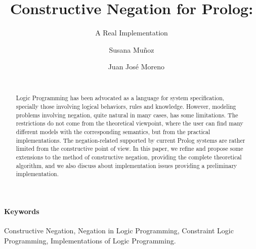 \documentclass{llncs}
\begin{document}

\title{Constructive Negation for Prolog:}
\subtitle{A Real Implementation}

\author{~~Susana Mu\~{n}oz~~ \and ~~ Juan Jos\'{e} Moreno \\
         ~~~~~~~~~~ }


\maketitle




\begin{abstract}
  Logic Programming has been advocated as a language for system
  specification, specially those involving logical behaviors, rules
  and knowledge. However, modeling problems involving negation, quite
  natural in many cases, has some limitations. The restrictions do not
  come from the theoretical viewpoint, where the user can find many
  different models with the corresponding semantics, but from the
  practical implementations.  The negation-related supported by
  current Prolog systems are rather limited from the constructive
  point of view.  In this paper, we refine and propose some extensions
  to the method of constructive negation, providing the complete
  theoretical algorithm, and we also discuss about implementation
  issues providing a preliminary implementation.
\end{abstract}

\paragraph{\bf Keywords}
Constructive Negation, Negation in Logic Programming, Constraint Logic
Programming, Implementations of Logic Programming.
\end{document}
